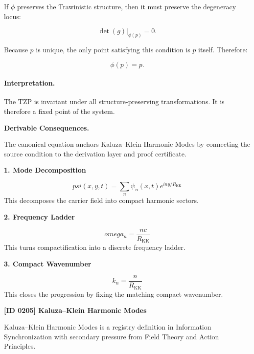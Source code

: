 If $\phi$ preserves the Trawinistic structure, then it must preserve the degeneracy locus:

\begin{equation}
\det(g)\big|_{\phi(p)}=0 .
\end{equation}

Because $p$ is unique, the only point satisfying this condition is $p$ itself. Therefore:

\begin{equation}
\phi(p)=p .
\end{equation}

\paragraph{Interpretation.}
The TZP is invariant under all structure-preserving transformations. It is therefore a fixed point of the system.

\par\vspace{0.35em}
\noindent\textbf{Derivable Consequences.}\quad
\begingroup
\footnotesize
\raggedright
The canonical equation anchors Kaluza--Klein Harmonic Modes by connecting the source condition to the derivation layer and proof certificate.
\par\endgroup

\noindent\textbf{1. Mode Decomposition}\par
\[
psi(x,y,t) = \sum_{n}\psi_n(x,t)e^{i n y/R_{\mathrm{KK}}}
\]
\noindent This decomposes the carrier field into compact harmonic sectors.\par
\noindent\textbf{2. Frequency Ladder}\par
\[
omega_n = \frac{n c}{R_{\mathrm{KK}}}
\]
\noindent This turns compactification into a discrete frequency ladder.\par
\noindent\textbf{3. Compact Wavenumber}\par
\[
k_n = \frac{n}{R_{\mathrm{KK}}}
\]
\noindent This closes the progression by fixing the matching compact wavenumber.\par

\clearpage
\noindent\textbf{[ID 0205] Kaluza--Klein Harmonic Modes}\par
\vspace{0.35em}
\begingroup\small
{}
Kaluza--Klein Harmonic Modes is a registry definition in Information Synchronization with secondary pressure from Field Theory and Action Principles.

